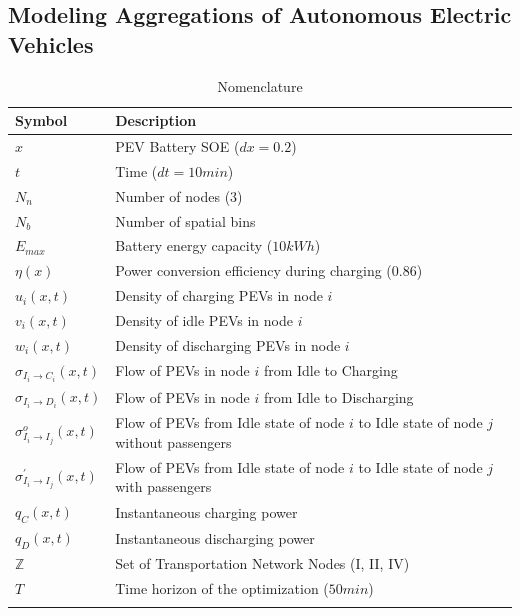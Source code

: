 \documentclass[journal]{IEEEtran}
\begin{document}
\subsection{Modeling Aggregations of Autonomous Electric Vehicles}
\begin{table}[!htbp]
\renewcommand{\arraystretch}{1.3}
\caption{Nomenclature}
\label{tab:symbols}
\centering
\def\colmargin{6.75cm}
\begin{tabular}{ll}
\hline
\textbf{Symbol} & \textbf{Description}\\
\hline
$x$ & PEV Battery SOE ($dx=0.2$) \\
$t$ & Time ($dt=10 min$) \\
$N_n$ & Number of nodes ($3$)\\
$N_b$ & Number of spatial bins\\
$E_{max}$ & Battery energy capacity ($10 kWh$) \\
$\eta(x)$ & Power conversion efficiency during charging ($0.86$) \\
$u_i(x,t)$ & Density of charging PEVs in node $i$\\
$v_i(x,t)$ & Density of idle PEVs in node $i$\\
$w_i(x,t)$ & Density of discharging PEVs in node $i$\\
$\sigma_{I_i \rightarrow C_i}(x,t)$ & \parbox[t]{\colmargin}{ \raggedright Flow of PEVs in node $i$ from Idle to Charging} \\
$\sigma_{I_i \rightarrow D_i}(x,t)$ & \parbox[t]{\colmargin}{Flow of PEVs in node $i$ from Idle to Discharging} \\
$\sigma_{I_i \rightarrow I_j}^o(x,t)$ & \parbox[t]{\colmargin}{Flow of PEVs from Idle state of node $i$ to Idle state of node $j$ without passengers} \\
$\sigma_{I_i \rightarrow I_j}^\prime(x,t)$ & \parbox[t]{\colmargin}{ Flow of PEVs from Idle state of node $i$ to Idle state of node $j$ with passengers} \\
$q_C(x,t)$ & Instantaneous charging power \\
$q_D(x,t)$ & Instantaneous discharging power \\
$\mathbb{Z}$ & Set of Transportation Network Nodes (I, II, IV) \\
$T$ & Time horizon of the optimization ($50 min$) \\
 & \\
\hline
\end{tabular}
\end{table}
\end{document}
